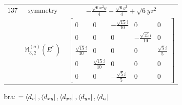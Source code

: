 \documentclass[fleqn,8pt,landscape]{jsarticle}
\begin{document}
\begin{longtable}{ccc}
$ 137 $ & $ \text{symmetry} $ & $ - \frac{\sqrt{6} x^{2} y}{4} - \frac{\sqrt{6} y^{3}}{4} + \sqrt{6} y z^{2} $ \\
$  $ & $ \mathbb{M}_{3,2}^{(a)}(E^{\prime\prime}) $ & $ \begin{bmatrix} 0 & 0 & - \frac{\sqrt{15} i}{10} & 0 & 0 \\ 0 & 0 & 0 & - \frac{\sqrt{15} i}{10} & 0 \\ \frac{\sqrt{15} i}{10} & 0 & 0 & 0 & \frac{\sqrt{5} i}{5} \\ 0 & \frac{\sqrt{15} i}{10} & 0 & 0 & 0 \\ 0 & 0 & - \frac{\sqrt{5} i}{5} & 0 & 0 \end{bmatrix} $ \\ \hline
\end{longtable}
bra: $=\bra{d_{v}}, \bra{d_{xy}}, \bra{d_{xz}}, \bra{d_{yz}}, \bra{d_{u}}$
\end{document}
